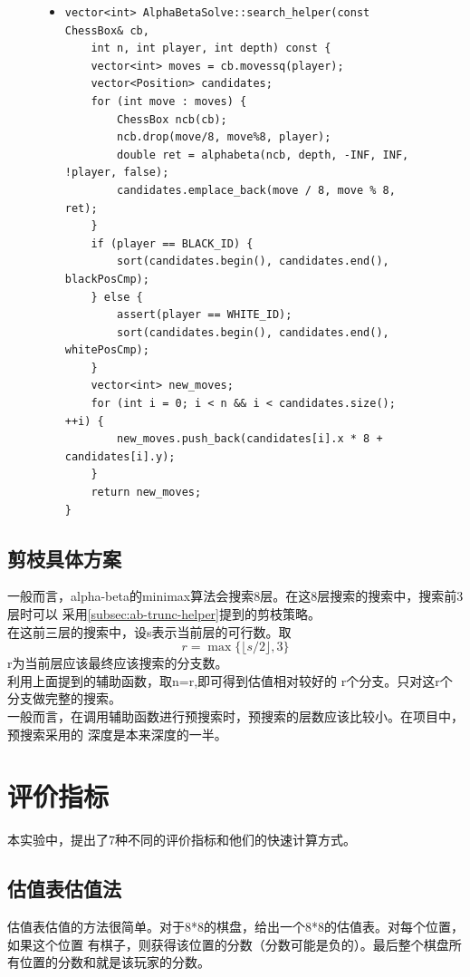 \documentclass[a4paper]{article}
\begin{document}
\begin{figure}[!hbt]
\begin{itemize}
\item[] \begin{lstlisting}[style=mycpp, label=lst:searchhelper, caption=行动方案预筛选函数]
vector<int> AlphaBetaSolve::search_helper(const ChessBox& cb, 
    int n, int player, int depth) const {
    vector<int> moves = cb.movessq(player);
    vector<Position> candidates;
    for (int move : moves) {
        ChessBox ncb(cb);
        ncb.drop(move/8, move%8, player);
        double ret = alphabeta(ncb, depth, -INF, INF, !player, false);
        candidates.emplace_back(move / 8, move % 8, ret);
    }
    if (player == BLACK_ID) {
        sort(candidates.begin(), candidates.end(), blackPosCmp);
    } else {
        assert(player == WHITE_ID);
        sort(candidates.begin(), candidates.end(), whitePosCmp);
    }
    vector<int> new_moves;
    for (int i = 0; i < n && i < candidates.size(); ++i) {
        new_moves.push_back(candidates[i].x * 8 + candidates[i].y);
    }
    return new_moves;
}
\end{lstlisting}
\end{itemize}
\end{figure}

\subsection{剪枝具体方案}
一般而言，alpha-beta的minimax算法会搜索8层。在这8层搜索的搜索中，搜索前3层时可以
采用\autoref{subsec:ab-trunc-helper}提到的剪枝策略。\\

在这前三层的搜索中，设s表示当前层的可行数。取$$r = \max \{\lfloor s / 2 \rfloor, 3\}$$
r为当前层应该最终应该搜索的分支数。\\

利用上面提到的辅助函数，取n=r,即可得到估值相对较好的
r个分支。只对这r个分支做完整的搜索。\\

一般而言，在调用辅助函数进行预搜索时，预搜索的层数应该比较小。在项目中，预搜索采用的
深度是本来深度的一半。

\section{评价指标}
本实验中，提出了7种不同的评价指标和他们的快速计算方式。
\subsection{估值表估值法}
估值表估值的方法很简单。对于8*8的棋盘，给出一个8*8的估值表。对每个位置，如果这个位置
有棋子，则获得该位置的分数（分数可能是负的）。最后整个棋盘所有位置的分数和就是该玩家的分数。\\
\end{document}
